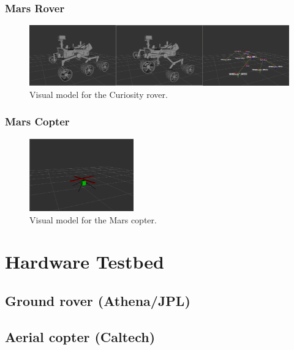 \documentclass[conference]{IEEEtran}
\begin{document}
\subsubsection{Mars Rover}
\begin{figure}
    \centering
    \includegraphics[width=\textwidth]{figs/report6/msl_visual.png}
    \caption{Visual model for the Curiosity rover.}
    \label{fig:msl_visual}
\end{figure}

\subsubsection{Mars Copter}

\begin{figure}
    \centering
    \includegraphics[width=0.4\textwidth]{figs/report6/copter_visual.png}
    \caption{Visual model for the Mars copter.}
    \label{fig:copter_visual}
\end{figure}





\section{Hardware Testbed}

\subsection{Ground rover (Athena/JPL)}


\subsection{Aerial copter (Caltech)}
\end{document}

